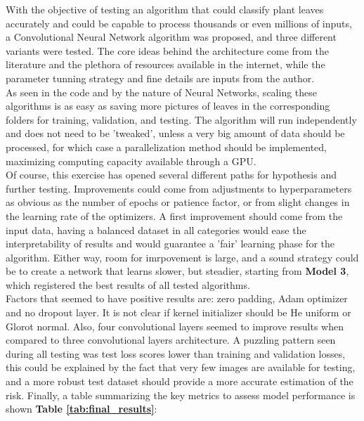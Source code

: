 \documentclass[11pt]{article}
\begin{document}
With the objective of testing  an algorithm that could classify plant leaves accurately and could be capable to process thousands or even millions of inputs, a Convolutional Neural Network algorithm was proposed, and three different variants were tested. The core ideas behind the architecture come from the literature and the plethora of resources available in the internet, while the parameter tunning strategy and fine details are inputs from the author.\\

As seen in the code and by the nature of Neural Networks, scaling these algorithms is as easy as saving more pictures of leaves in the corresponding folders for training, validation, and testing. The algorithm will run independently and does not need to be 'tweaked', unless a very big amount of data should be processed, for which case a parallelization method should be implemented, maximizing computing capacity available through a GPU.\\

Of course, this exercise has opened several different paths for hypothesis and further testing. Improvements could come from adjustments to hyperparameters as obvious as the number of epochs or patience factor, or from slight changes in the learning rate of the optimizers. A first improvement should come from the input data, having a balanced dataset in all categories would ease the interpretability of results and would guarantee a 'fair' learning phase for the algorithm. Either way, room for imrpovement is large, and a sound strategy could be to create a network that learns slower, but steadier, starting from \textbf{Model 3}, which registered the best results of all tested algorithms.\\

Factors that seemed to have positive results are: zero padding, Adam optimizer and no dropout layer. It is not clear if kernel initializer should be He uniform or Glorot normal. Also, four convolutional layers seemed to improve results when compared to three convolutional layers architecture. A puzzling pattern seen during all testing was test loss scores lower than training and validation losses, this could be explained by the fact that very few images are available for testing, and a more robust test dataset should provide a more accurate estimation of the risk. Finally, a table summarizing the key metrics to assess model performance is shown \textbf{Table \ref{tab:final_results}}:\\
\end{document}
